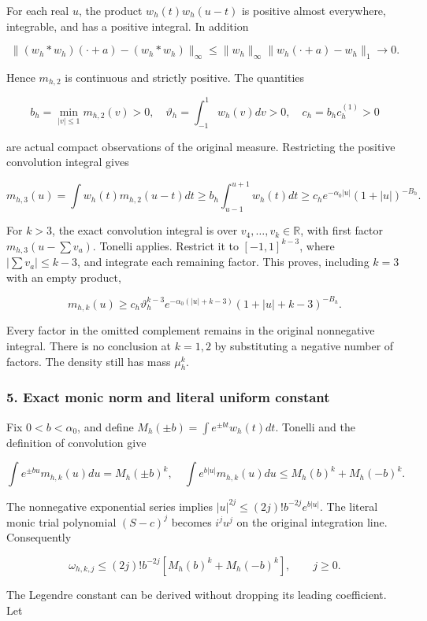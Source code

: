 For each real \(u\), the product \(w_h(t)w_h(u-t)\) is positive almost everywhere, integrable, and has a positive integral. In addition

\[
\|(w_h*w_h)(\cdot+a)-(w_h*w_h)\|_\infty
\le\|w_h\|_\infty\|w_h(\cdot+a)-w_h\|_1\longrightarrow0.
\]

Hence \(m_{h,2}\) is continuous and strictly positive. The quantities

\[
b_h=\min_{|v|\le1}m_{h,2}(v)>0,\quad
\vartheta_h=\int_{-1}^1w_h(v)dv>0,\quad c_h=b_hc_h^{(1)}>0
\]

are actual compact observations of the original measure. Restricting the positive convolution integral gives

\[
m_{h,3}(u)=\int w_h(t)m_{h,2}(u-t)dt
\ge b_h\int_{u-1}^{u+1}w_h(t)dt
\ge c_he^{-\alpha_0|u|}(1+|u|)^{-B_h}.
\]

For \(k>3\), the exact convolution integral is over \(v_4,\ldots,v_k\in\mathbb R\), with first factor \(m_{h,3}(u-\sum v_a)\). Tonelli applies. Restrict it to \([-1,1]^{k-3}\), where \(|\sum v_a|\le k-3\), and integrate each remaining factor. This proves, including \(k=3\) with an empty product,

\[
m_{h,k}(u)\ge c_h\vartheta_h^{k-3}
e^{-\alpha_0(|u|+k-3)}(1+|u|+k-3)^{-B_h}.
\]

Every factor in the omitted complement remains in the original nonnegative integral. There is no conclusion at \(k=1,2\) by substituting a negative number of factors. The density still has mass \(\mu_h^k\).

\subsubsection{5. Exact monic norm and literal uniform constant}\label{endpoint-arithmetic_intake--exact-monic-norm-and-literal-uniform-constant}

Fix \(0<b<\alpha_0\), and define \(M_h(\pm b)=\int e^{\pm bt}w_h(t)dt\). Tonelli and the definition of convolution give

\[
\int e^{\pm bu}m_{h,k}(u)du=M_h(\pm b)^k,
\quad\int e^{b|u|}m_{h,k}(u)du\le M_h(b)^k+M_h(-b)^k.
\]

The nonnegative exponential series implies \(|u|^{2j}\le(2j)!b^{-2j}e^{b|u|}\). The literal monic trial polynomial \((S-c)^j\) becomes \(i^ju^j\) on the original integration line. Consequently

\[
\omega_{h,k,j}\le(2j)!b^{-2j}[M_h(b)^k+M_h(-b)^k],\qquad j\ge0.
\]

The Legendre constant can be derived without dropping its leading coefficient. Let

